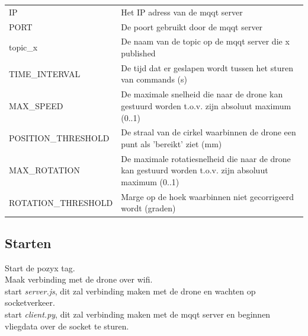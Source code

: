 \begin{tabular}{ l | l }
IP & Het IP adress van de mqqt server\\
PORT & De poort gebruikt door de mqqt server\\
topic\_x & De naam van de topic op de mqqt server die x published\\
TIME\_INTERVAL & De tijd dat er geslapen wordt tussen het sturen van commands (s)\\
MAX\_SPEED & De maximale snelheid die naar de drone kan gestuurd worden t.o.v. zijn absoluut maximum (0..1)\\
POSITION\_THRESHOLD & De straal van de cirkel waarbinnen de drone een punt als 'bereikt' ziet (mm)\\
MAX\_ROTATION & De maximale rotatiesnelheid die naar de drone kan gestuurd worden t.o.v. zijn absoluut maximum (0..1)\\
ROTATION\_THRESHOLD & Marge op de hoek waarbinnen niet gecorrigeerd wordt (graden)\\
\end{tabular}




\subsection{Starten}


Start de pozyx tag.\\
Maak verbinding met de drone over wifi.\\
start \textit{server.js}, dit zal verbinding maken met de drone en wachten op socketverkeer.\\
start \textit{client.py}, dit zal verbinding maken met de mqqt server en beginnen vliegdata over de socket te sturen.\\
